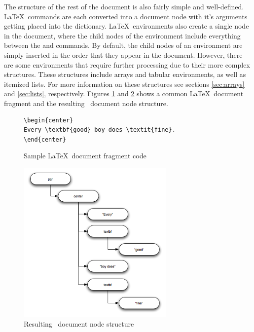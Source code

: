 The structure of the rest of the document is also fairly simple and 
well-defined.  \LaTeX\ commands are each converted into a document node
with it's arguments getting placed into the  dictionary.
\LaTeX\ environments also create a single node in the document, where
the child nodes of the environment include everything between the 
 and  commands.  By default, the child nodes of
an environment are simply inserted in the order that they appear in the 
document.  However, there are some environments that require further
processing due to their more complex structures.  These structures include
arrays and tabular environments, as well as itemized lists.  For more
information on these structures see sections \ref{sec:arrays} and
\ref{sec:lists}, respectively.  Figures \ref{fig:docfragcode} and 
\ref{fig:docfrag} shows a common \LaTeX\ document fragment and the 
resulting \plasTeX\ document node structure.

\begin{figure}[ht]
\begin{verbatim}
\begin{center}
Every \textbf{good} boy does \textit{fine}.
\end{center}
\end{verbatim}
\caption{Sample \LaTeX\ document fragment code\label{fig:docfragcode}}
\end{figure}

\begin{figure}[ht]
\begin{center}
\includegraphics[width=3in]{docfrag}
\end{center}
\caption{Resulting \plasTeX\ document node structure\label{fig:docfrag}}
\end{figure}

